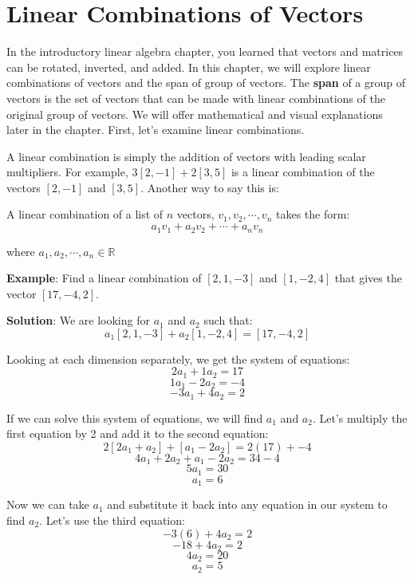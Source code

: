 \chapter{Linear Combinations of Vectors}

In the introductory linear algebra chapter, you learned that vectors and 
matrices can be rotated, inverted, and added. In this chapter, we will explore 
linear combinations of vectors and the span of group of vectors. The 
\textbf{span} of a group of vectors is the set of vectors that can 
be made with linear combinations of the original group of vectors. We will 
offer mathematical and visual explanations later in the chapter. First, let's 
examine linear combinations. 

A linear combination is simply the addition of vectors with leading scalar 
multipliers. For example, $3 \left[ 2, -1 \right] + 2 \left[ 3, 5 \right]$ is 
a linear combination of the vectors $\left[ 2, -1 \right]$ and $\left[ 3, 5 
\right]$. Another way to say this is:

\begin{mdframed}[style = important, frametitle = {Linear Combination of 
Vectors}]
A linear combination of a list of $n$ vectors, $v_1, v_2, \cdots, v_n$ takes 
the form:
$$a_1 v_1 + a_2 v_2 + \cdots + a_n v_n$$

where $a_1, a_2, \cdots, a_n \in \mathbb{R}$
\end{mdframed}

\textbf{Example}: Find a linear combination of $\left[ 2, 1, -3 \right]$ and 
$\left[ 1, -2, 4 \right]$ that gives the vector $\left[ 17, -4, 2 \right]$.

\textbf{Solution}: We are looking for $a_1$ and $a_2$ such that:
$$a_1 \left[ 2, 1, -3 \right] + a_2 \left[ 1, -2, 4 \right] = \left[17, -4, 2 
\right]$$

Looking at each dimension separately, we get the system of equations:
$$2 a_1 + 1 a_2 = 17$$
$$1 a_1 - 2 a_2 = -4$$
$$-3 a_1 + 4 a_2 = 2$$

If we can solve this system of equations, we will find $a_1$ and $a_2$. Let's 
multiply the first equation by 2 and add it to the second equation:
$$2 \left[ 2 a_1 + a_2 \right] + \left[ a_1 - 2 a_2 \right] = 2 \left( 17 
\right) + -4$$
$$4 a_1 + 2 a_2 + a_1 - 2 a_2 = 34 - 4$$
$$5 a_1 = 30$$
$$a_1 = 6$$

Now we can take $a_1$ and substitute it back into any equation in our system 
to find $a_2$. Let's use the third equation:
$$-3 \left( 6 \right) + 4 a_2 = 2$$
$$ -18 + 4 a_2 = 2$$
$$4 a_2 = 20$$
$$a_2 = 5$$

